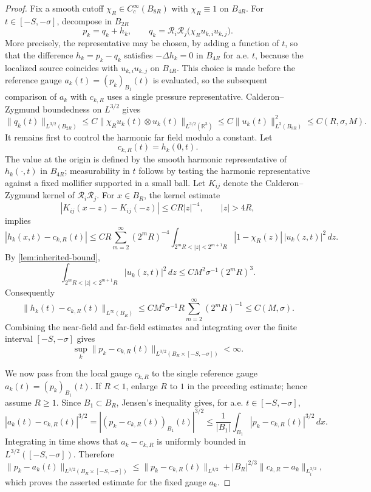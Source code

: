 \documentclass[11pt]{amsart}
\theoremstyle{plain}
\theoremstyle{definition}
\theoremstyle{remark}
\numberwithin{equation}{section}
\newcommand{\R}{\mathbb R}
\begin{document}
\begin{proof}
Fix a smooth cutoff \(\chi_R\in C_c^\infty(B_{8R})\) with
\(\chi_R\equiv1\) on \(B_{4R}\).  For \(t\in[-S,-\sigma]\), decompose in
\(B_{2R}\)
\[
   p_k=q_k+h_k,
   \qquad
   q_k=\mathcal R_i\mathcal R_j\bigl(\chi_R u_{k,i}u_{k,j}\bigr).
\]
More precisely, the representative may be chosen, by adding a function of
\(t\), so that the difference \(h_k=p_k-q_k\) satisfies
\(-\Delta h_k=0\) in \(B_{4R}\) for a.e. \(t\), because the localized source
coincides with \(u_{k,i}u_{k,j}\) on \(B_{4R}\).  This choice is made before
the reference gauge \(a_k(t)=(p_k)_{B_1}(t)\) is evaluated, so the subsequent
comparison of \(a_k\) with \(c_{k,R}\) uses a single pressure representative.
Calderon--Zygmund boundedness on \(L^{3/2}\) gives
\[
   \|q_k(t)\|_{L^{3/2}(B_{2R})}
   \le C\|\chi_R u_k(t)\otimes u_k(t)\|_{L^{3/2}(\R^3)}
   \le C\|u_k(t)\|_{L^3(B_{8R})}^2
   \le C(R,\sigma,M).
\]
It remains first to control the harmonic far field modulo a constant.  Let
\[
   c_{k,R}(t)=h_k(0,t).
\]
The value at the origin is defined by the smooth harmonic representative of
\(h_k(\cdot,t)\) in \(B_{4R}\); measurability in \(t\) follows by testing the
harmonic representative against a fixed mollifier supported in a small ball.
Let \(K_{ij}\) denote the Calderon--Zygmund kernel of
\(\mathcal R_i\mathcal R_j\).  For \(x\in B_R\), the kernel estimate
\[
   |K_{ij}(x-z)-K_{ij}(-z)|\le C R |z|^{-4},
   \qquad |z|>4R,
\]
implies
\[
   |h_k(x,t)-c_{k,R}(t)|
   \le
   C R\sum_{m=2}^\infty (2^mR)^{-4}
   \int_{2^mR<|z|<2^{m+1}R}|1-\chi_R(z)|\,|u_k(z,t)|^2\,dz .
\]
By \cref{lem:inherited-bound},
\[
   \int_{2^mR<|z|<2^{m+1}R}|u_k(z,t)|^2\,dz
   \le C M^2\sigma^{-1}(2^mR)^3 .
\]
Consequently
\[
   \|h_k(t)-c_{k,R}(t)\|_{L^\infty(B_R)}
   \le
   C M^2\sigma^{-1}
   R\sum_{m=2}^\infty (2^mR)^{-1}
   \le C(M,\sigma).
\]
Combining the near-field and far-field estimates and integrating over the
finite interval \([-S,-\sigma]\) gives
\[
   \sup_k\|p_k-c_{k,R}(t)\|_{L^{3/2}(B_R\times[-S,-\sigma])}<\infty .
\]

We now pass from the local gauge \(c_{k,R}\) to the single reference gauge
\(a_k(t)=(p_k)_{B_1}(t)\).  If \(R<1\), enlarge \(R\) to \(1\) in the preceding
estimate; hence assume \(R\ge1\).  Since \(B_1\subset B_R\),
Jensen's inequality gives, for a.e. \(t\in[-S,-\sigma]\),
\[
   |a_k(t)-c_{k,R}(t)|^{3/2}
   =
   \left|(p_k-c_{k,R}(t))_{B_1}(t)\right|^{3/2}
   \le
   \frac1{|B_1|}\int_{B_1}|p_k-c_{k,R}(t)|^{3/2}\,dx .
\]
Integrating in time shows that \(a_k-c_{k,R}\) is uniformly bounded in
\(L^{3/2}([-S,-\sigma])\).  Therefore
\[
   \|p_k-a_k(t)\|_{L^{3/2}(B_R\times[-S,-\sigma])}
   \le
   \|p_k-c_{k,R}(t)\|_{L^{3/2}}
   + |B_R|^{2/3}\|c_{k,R}-a_k\|_{L^{3/2}_t},
\]
which proves the asserted estimate for the fixed gauge \(a_k\).
\end{proof}
\end{document}
